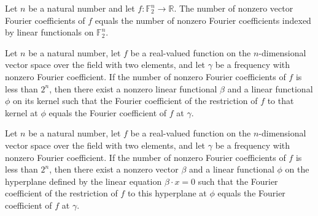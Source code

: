 \begin{theorem}
\label{FABL.dualSpectralSparsity_eq_spectralSparsity}
\leanok
{}
Let $n$ be a natural number and let $f:\mathbb{F}_2^n\to\mathbb{R}$. The number of
nonzero vector Fourier coefficients of $f$ equals the number of nonzero Fourier
coefficients indexed by linear functionals on $\mathbb{F}_2^n$.
\end{theorem}

\begin{theorem}
\label{FABL.exists_nonzero_vectorFourierCoeff_subspaceRestriction_eq}
\leanok
{}
Let $n$ be a natural number, let $f$ be a real-valued function on the $n$-dimensional
vector space over the field with two elements, and let $\gamma$ be a frequency with
nonzero Fourier coefficient. If the number of nonzero Fourier coefficients of $f$ is
less than $2^n$, then there exist a nonzero linear functional $\beta$ and a linear
functional $\phi$ on its kernel such that the Fourier coefficient of the restriction of
$f$ to that kernel at $\phi$ equals the Fourier coefficient of $f$ at $\gamma$.
\end{theorem}

\begin{theorem}
\label{FABL.exists_nonzero_vectorFourierCoeff_hyperplaneRestriction_eq}
\leanok
{}
Let $n$ be a natural number, let $f$ be a real-valued function on the $n$-dimensional
vector space over the field with two elements, and let $\gamma$ be a frequency with
nonzero Fourier coefficient. If the number of nonzero Fourier coefficients of $f$ is
less than $2^n$, then there exist a nonzero vector $\beta$ and a linear functional
$\phi$ on the hyperplane defined by the linear equation $\beta\cdot x=0$ such that the
Fourier coefficient of the restriction of $f$ to this hyperplane at $\phi$ equals the
Fourier coefficient of $f$ at $\gamma$.
\end{theorem}

